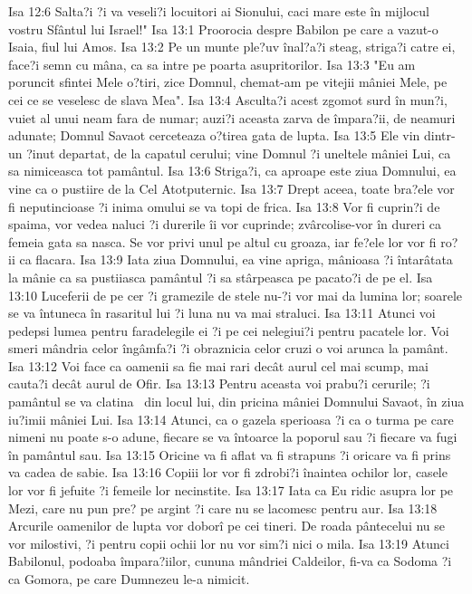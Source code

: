 Isa 12:6  Salta?i ?i va veseli?i locuitori ai Sionului, caci mare este în mijlocul vostru Sfântul lui Israel!"
Isa 13:1  Proorocia despre Babilon pe care a vazut-o Isaia, fiul lui Amos.
Isa 13:2  Pe un munte ple?uv înal?a?i steag, striga?i catre ei, face?i semn cu mâna, ca sa intre pe poarta asupritorilor.
Isa 13:3  "Eu am poruncit sfintei Mele o?tiri, zice Domnul, chemat-am pe vitejii mâniei Mele, pe cei ce se veselesc de slava Mea".
Isa 13:4  Asculta?i acest zgomot surd în mun?i, vuiet al unui neam fara de numar; auzi?i aceasta zarva de împara?ii, de neamuri adunate; Domnul Savaot cerceteaza o?tirea gata de lupta.
Isa 13:5  Ele vin dintr-un ?inut departat, de la capatul cerului; vine Domnul ?i uneltele mâniei Lui, ca sa nimiceasca tot pamântul.
Isa 13:6  Striga?i, ca aproape este ziua Domnului, ea vine ca o pustiire de la Cel Atotputernic.
Isa 13:7  Drept aceea, toate bra?ele vor fi neputincioase ?i inima omului se va topi de frica.
Isa 13:8  Vor fi cuprin?i de spaima, vor vedea naluci ?i durerile îi vor cuprinde; zvârcolise-vor în dureri ca femeia gata sa nasca. Se vor privi unul pe altul cu groaza, iar fe?ele lor vor fi ro?ii ca flacara.
Isa 13:9  Iata ziua Domnului, ea vine apriga, mânioasa ?i întarâtata la mânie ca sa pustiiasca pamântul ?i sa stârpeasca pe pacato?i de pe el.
Isa 13:10  Luceferii de pe cer ?i gramezile de stele nu-?i vor mai da lumina lor; soarele se va întuneca în rasaritul lui ?i luna nu va mai straluci.
Isa 13:11  Atunci voi pedepsi lumea pentru faradelegile ei ?i pe cei nelegiui?i pentru pacatele lor. Voi smeri mândria celor îngâmfa?i ?i obraznicia celor cruzi o voi arunca la pamânt.
Isa 13:12  Voi face ca oamenii sa fie mai rari decât aurul cel mai scump, mai cauta?i decât aurul de Ofir.
Isa 13:13  Pentru aceasta voi prabu?i cerurile; ?i pamântul se va clatina  din locul lui, din pricina mâniei Domnului Savaot, în ziua iu?imii mâniei Lui.
Isa 13:14  Atunci, ca o gazela sperioasa ?i ca o turma pe care nimeni nu poate s-o adune, fiecare se va întoarce la poporul sau ?i fiecare va fugi în pamântul sau.
Isa 13:15  Oricine va fi aflat va fi strapuns ?i oricare va fi prins va cadea de sabie.
Isa 13:16  Copiii lor vor fi zdrobi?i înaintea ochilor lor, casele lor vor fi jefuite ?i femeile lor necinstite.
Isa 13:17  Iata ca Eu ridic asupra lor pe Mezi, care nu pun pre? pe argint ?i care nu se lacomesc pentru aur.
Isa 13:18  Arcurile oamenilor de lupta vor doborî pe cei tineri. De roada pântecelui nu se vor milostivi, ?i pentru copii ochii lor nu vor sim?i nici o mila.
Isa 13:19  Atunci Babilonul, podoaba împara?iilor, cununa mândriei Caldeilor, fi-va ca Sodoma ?i ca Gomora, pe care Dumnezeu le-a nimicit.
